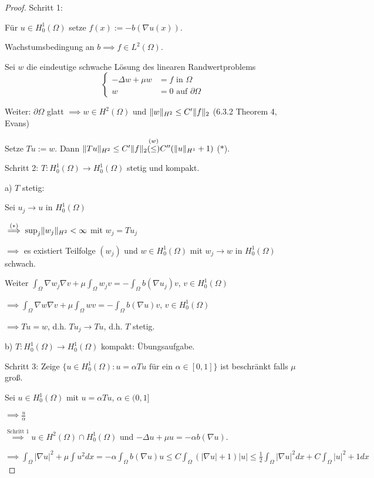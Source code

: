 \begin{proof}
  Schritt 1:

  Für $u \in H_0^1(\Omega)$ setze $f(x) := -b (\nabla u(x))$.

  Wachstumsbedingung an $b \implies f \in L^2(\Omega)$.

  Sei $w$ die eindeutige schwache Lösung des linearen Randwertproblems
  $$
  \begin{cases}
    -\Delta w + \mu w &= f \text{ in } \Omega \\
    w &= 0 \text{ auf } \partial \Omega
  \end{cases}
  $$

  Weiter: $\partial \Omega$ glatt $\implies w \in H^2(\Omega)$ und $\lVert w \rVert_{H^2} \leq C'\lVert f \rVert_2$ (6.3.2 Theorem 4,  Evans)

  Setze $T u := w.$ Dann $\lVert Tu \rVert_{H^2}  \leq C'\lVert f \rVert_2 \overset{(w)}{(\leq)} C''(\lVert u \rVert_{H^1} + 1)$ ($\ast$).

  Schritt 2: $T \colon H_0^1(\Omega) \to H_0^1(\Omega)$ stetig und kompakt.

  a) $T$ stetig: 

  Sei $u_j \to u$ in $H_0^1(\Omega)$

  $\overset{(\ast)}{\implies} \sup_j \lVert w_j \rVert_{H^2} < \infty$ mit $w_j = T u_j$

  $\implies$ es existiert Teilfolge $(w_j)$ und $w \in H_0^1(\Omega)$ mit $w_j \to w$ in $H_0^1(\Omega)$ schwach.

  Weiter $\int_\Omega \nabla w_j \nabla v + \mu \int_\Omega w_j v = - \int_\Omega b(\nabla u_j) v$, $v \in H_0^1(\Omega)$

  $\implies \int_\Omega \nabla w \nabla v + \mu \int_\Omega w v = - \int_\Omega b(\nabla u) v$, $v \in H_0^1(\Omega)$

  $\implies Tu = w$, d.h. $T u_j \to T u$, d.h. $T$ stetig.

  b) $T: H_0^1(\Omega) \to H_0^1(\Omega)$ kompakt: Übungsaufgabe.

  Schritt 3: Zeige 
  $
    \{ u \in H_0^1(\Omega) \colon u = \alpha Tu \text{ für ein } \alpha \in [0,1] \}
  $
  ist beschränkt falls $\mu$ groß.

  Sei $u \in H_0^1(\Omega)$ mit $u = \alpha Tu$, $\alpha \in (0,1]$

  $\implies \frac{u}{\alpha}$

  $\overset{\text{Schritt 1}}{\implies} u \in H^2(\Omega) \cap H_0^1(\Omega)$ und $-\Delta u + \mu u = -\alpha b(\nabla u).$

  $\implies \int_\Omega |\nabla u|^2 + \mu \int u^2 dx = -\alpha \int_\Omega b(\nabla u) u \leq C\int_\Omega (|\nabla u| + 1) |u| \leq \frac{1}{2} \int_\Omega |\nabla u|^2 dx + C\int_\Omega |u|^2 + 1 dx$


\end{proof}
